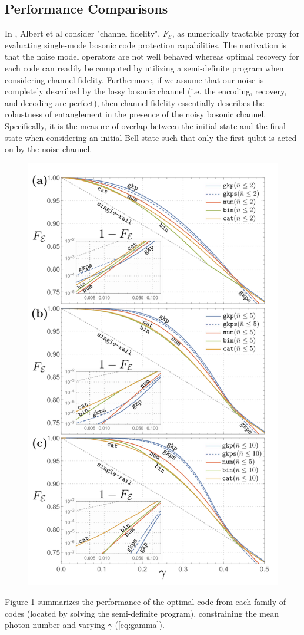 \documentclass[12]{amsart}
\newcommand\0{\mathbf{0}}
\newcommand\<{\langle}
\renewcommand\>{\rangle}
\begin{document}
\subsection{Performance Comparisons}
\label{sec:perf}

In \cite{albert2017performance}, Albert et al consider "channel fidelity", $F_\mathcal{E}$,  as numerically tractable proxy for evaluating single-mode bosonic code protection capabilities. The motivation is that the noise model operators are not well behaved whereas optimal recovery for each code can readily be computed by utilizing a semi-definite program when considering channel fidelity. Furthermore, if we assume that our noise is completely described by the lossy bosonic channel (i.e. the encoding, recovery, and decoding are perfect), then channel fidelity essentially describes the robustness of entanglement in the presence of the noisy bosonic channel. Specifically, it is the measure of overlap between the initial state and the final state when considering an initial Bell state such that only the first qubit is acted on by the noise channel.

\begin{figure}[H]
\label{fig:perf}
\centering
\includegraphics[width=0.5\linewidth,keepaspectratio]{fidelity.png}	
\end{figure}

Figure \ref{fig:perf} summarizes the performance of the optimal code from each family of codes (located by solving the semi-definite program), constraining the mean photon number and varying $\gamma$ (\ref{eq:gamma}).
\end{document}
